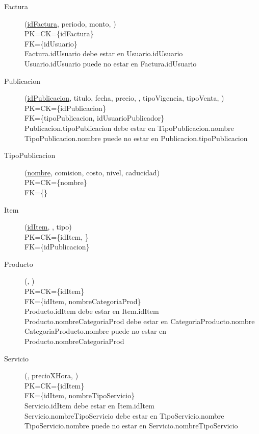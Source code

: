 \begin{description}
 \item[Factura](\underline{idFactura}, periodo, monto, )\\
PK=CK=\{idFactura\}\\
FK=\{idUsuario\}\\
Factura.idUsuario debe estar en Usuario.idUsuario\\
Usuario.idUsuario puede no estar en Factura.idUsuario

 \item[Publicacion](\underline{idPublicacion}, titulo, fecha, precio, , tipoVigencia, tipoVenta, )\\
PK=CK=\{idPublicacion\}\\
FK=\{tipoPublicacion, idUsuarioPublicador\}\\
Publicacion.tipoPublicacion debe estar en TipoPublicacion.nombre\\
TipoPublicacion.nombre puede no estar en Publicacion.tipoPublicacion

 \item[TipoPublicacion](\underline{nombre}, comision, costo, nivel, caducidad)\\
PK=CK=\{nombre\}\\
FK=\{\}

 \item[Item](\underline{idItem}, , tipo)\\
PK=CK=\{idItem, \}\\
FK=\{idPublicacion\}

 \item[Producto](\underline{}, )\\
PK=CK=\{idItem\}\\
FK=\{idItem, nombreCategoriaProd\}\\
Producto.idItem debe estar en Item.idItem\\
Producto.nombreCategoriaProd debe estar en CategoriaProducto.nombre\\
CategoriaProducto.nombre puede no estar en Producto.nombreCategoriaProd

 \item[Servicio](\underline{}, precioXHora, )\\
PK=CK=\{idItem\}\\
FK=\{idItem, nombreTipoServicio\}\\
Servicio.idItem debe estar en Item.idItem\\
Servicio.nombreTipoServicio debe estar en TipoServicio.nombre\\
TipoServicio.nombre puede no estar en Servicio.nombreTipoServicio


\end{description}
